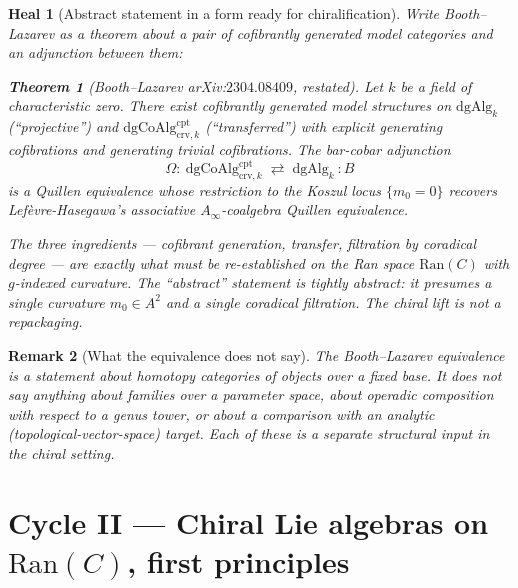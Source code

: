 \documentclass[11pt]{amsart}
\newtheorem*{heal}{Heal}
\newtheorem{theorem}{Theorem}[section]
\newtheorem{remark}[theorem]{Remark}
\newcommand{\Ran}{\mathrm{Ran}}
\newcommand{\crv}{\mathrm{crv}}
\newcommand{\cpt}{\mathrm{cpt}}
\newcommand{\dgAlg}{\mathrm{dgAlg}}
\newcommand{\dgCoAlg}{\mathrm{dgCoAlg}}
\begin{document}
\begin{heal}[Abstract statement in a form ready for chiralification]
Write Booth--Lazarev as a theorem about a pair of cofibrantly
generated model categories and an adjunction between them:
\begin{theorem}[Booth--Lazarev arXiv:$2304.08409$, restated]
\label{thm:bl-restated}
Let $k$ be a field of characteristic zero. There exist cofibrantly
generated model structures on $\dgAlg_k$ (``projective'') and
$\dgCoAlg^{\cpt}_{\crv,k}$ (``transferred'') with explicit
generating cofibrations and generating trivial cofibrations. The
bar-cobar adjunction
\[
\Omega:\ \dgCoAlg^{\cpt}_{\crv,k}\;\rightleftarrows\;\dgAlg_k\ :B
\]
is a Quillen equivalence whose restriction to the Koszul locus
$\{m_0=0\}$ recovers Lef\`evre-Hasegawa's associative
$A_\infty$-coalgebra Quillen equivalence.
\end{theorem}
The three ingredients --- cofibrant generation, transfer, filtration
by coradical degree --- are exactly what must be re-established on
the Ran space $\Ran(C)$ with $g$-indexed curvature. The ``abstract''
statement is tightly abstract: it presumes a single curvature $m_0\in
A^2$ and a single coradical filtration. The chiral lift is not a
repackaging.
\end{heal}

\begin{remark}[What the equivalence does not say]
The Booth--Lazarev equivalence is a statement about homotopy categories
of objects over a fixed base. It does not say anything about
\emph{families} over a parameter space, about operadic composition
with respect to a genus tower, or about a comparison with an analytic
(topological-vector-space) target. Each of these is a separate
structural input in the chiral setting.
\end{remark}

\section{Cycle II --- Chiral Lie algebras on $\Ran(C)$,
first principles}
\label{sec:cycle-II}
\end{document}
